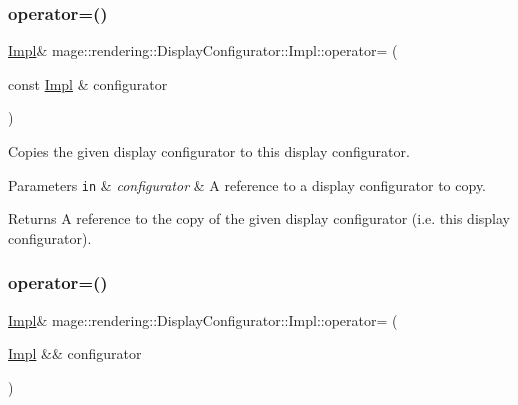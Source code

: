 \subsubsection{\texorpdfstring{operator=()}{operator=()}\hspace{0.1cm}{\footnotesize\ttfamily [1/2]}}
{\footnotesize\ttfamily \mbox{\hyperlink{classmage_1_1rendering_1_1_display_configurator_1_1_impl}{Impl}}\& mage\+::rendering\+::\+Display\+Configurator\+::\+Impl\+::operator= (\begin{DoxyParamCaption}\item[{const \mbox{\hyperlink{classmage_1_1rendering_1_1_display_configurator_1_1_impl}{Impl}} \&}]{configurator }\end{DoxyParamCaption})\hspace{0.3cm}{\ttfamily [delete]}}

Copies the given display configurator to this display configurator.


\begin{DoxyParams}[1]{Parameters}
\mbox{\tt in}  & {\em configurator} & A reference to a display configurator to copy. \\
\hline
\end{DoxyParams}
\begin{DoxyReturn}{Returns}
A reference to the copy of the given display configurator (i.\+e. this display configurator). 
\end{DoxyReturn}
\mbox{\label{classmage_1_1rendering_1_1_display_configurator_1_1_impl_a8e8c87b0dea178867baaa737517d9ed0}} 
\subsubsection{\texorpdfstring{operator=()}{operator=()}\hspace{0.1cm}{\footnotesize\ttfamily [2/2]}}
{\footnotesize\ttfamily \mbox{\hyperlink{classmage_1_1rendering_1_1_display_configurator_1_1_impl}{Impl}}\& mage\+::rendering\+::\+Display\+Configurator\+::\+Impl\+::operator= (\begin{DoxyParamCaption}\item[{\mbox{\hyperlink{classmage_1_1rendering_1_1_display_configurator_1_1_impl}{Impl}} \&\&}]{configurator }\end{DoxyParamCaption})\hspace{0.3cm}{\ttfamily [delete]}}

